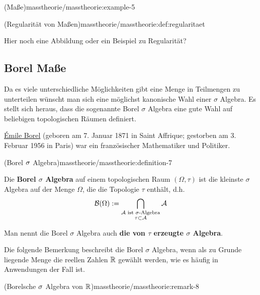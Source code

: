\begin{example}{(Maße)}{masstheorie/masstheorie:example-5}
\begin{definition}{(Regularität von Maßen)}{masstheorie/masstheorie:def:regularitaet}
\begin{enumerate}
\end{enumerate}
\end{definition}

\par
Hier noch eine Abbildung oder ein Beispiel zu Regularität?


\subsection{Borel Maße}
\label{\detokenize{masstheorie/masstheorie:borel-masze}}
\par
Da es viele unterschiedliche Möglichkeiten gibt eine Menge in Teilmengen zu unterteilen wünscht man sich eine möglichst kanonische Wahl einer \(\sigma\) Algebra.
Es stellt sich heraus, dass die sogenannte Borel \(\sigma\) Algebra eine gute Wahl auf beliebigen topologischen Räumen definiert.

\begin{emphBox}{}{}

\par
\href{https://de.wikipedia.org/wiki/\%C3\%89mile\_Borel}{Émile Borel} (geboren am 7. Januar 1871 in Saint Affrique; gestorben am 3. Februar 1956 in Paris) war ein französischer Mathematiker und Politiker.
\end{emphBox}
\begin{definition}{(Borel \protect\(\sigma\protect\) Algebra)}{masstheorie/masstheorie:definition-7}



\par
Die \textbf{Borel \(\sigma\) Algebra} auf einem topologischen Raum \((\Omega, \tau)\) ist die kleinste \(\sigma\) Algebra auf der Menge \(\Omega\), die die Topologie \(\tau\) enthält, d.h.
\begin{align*}
\mathcal{B}(\Omega) := \bigcap_{\substack{\mathcal{A} \text{ ist $\sigma$-Algebra}\\ \tau \subset \mathcal{A}}} \mathcal{A}
\end{align*}
\par
Man nennt die Borel \(\sigma\) Algebra auch \textbf{die von \(\tau\) erzeugte \(\sigma\) Algebra}.
\end{definition}

\par
Die folgende Bemerkung beschreibt die Borel \(\sigma\) Algebra, wenn als zu Grunde liegende Menge die reellen Zahlen \(\mathbb{R}\) gewählt werden, wie es häufig in Anwendungen der Fall ist.
\begin{remark}{(Borelsche \protect\(\sigma\protect\) Algebra von \protect\(\mathbb{R}\protect\))}{masstheorie/masstheorie:remark-8}




\end{remark}
\end{example}
